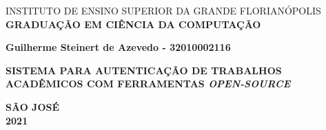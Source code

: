 \newcommand{\seniorThesisTitle}{Sistema para autenticação de
trabalhos acadêmicos com ferramentas \textit{open-source}}
\begin{center}
    \uppercase{instituto de ensino superior da grande florianópolis}
    \textbf{\uppercase{graduação em ciência da computação}}

    \vspace*{2cm}

    \textbf{Guilherme Steinert de Azevedo - 32010002116}

    \vspace*{3.5cm}

    \textbf{\uppercase{\seniorThesisTitle}}
    \vfill

    {\large \bfseries \uppercase{São José \\ 2021}}
\end{center}
\newpage

